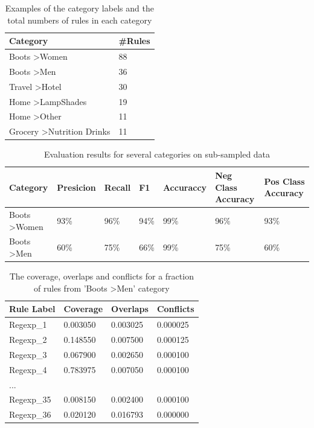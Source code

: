 \begin{table}
  \caption{Examples of the category labels and the total numbers of rules in each category}
  \label{tab:numrules}
  \begin{tabular}{ll}
    \toprule
    Category & \#Rules\\
    \midrule
    Boots \textgreater Women &	88	\\
    Boots \textgreater Men	& 36 \\
 	Travel \textgreater Hotel & 30 \\
 	Home \textgreater LampShades & 19 \\
 	Home \textgreater Other & 11 \\
 	Grocery \textgreater Nutrition Drinks & 11 \\
    \bottomrule
  \end{tabular}
\end{table}

\begin{table}
  \caption{Evaluation results for several categories on sub-sampled data}
  \label{tab:evaluation}
  \begin{tabular}{lllllll}
    \toprule
    Category & Presicion & Recall & F1 & Accuraccy & Neg Class Accuracy & Pos Class Accuracy\\
    \midrule 
    Boots \textgreater Women	& 93\% & 96\% & 94\% & 99\% & 96\% & 93\% \\
    Boots \textgreater Men &	60\%	& 75\% & 66\% & 99\% & 75\% & 60\% \\
    \bottomrule
  \end{tabular}
\end{table}

\begin{table}
  \caption{The coverage, overlaps and conflicts for a fraction of rules from 'Boots \textgreater Men' category}
  \label{tab:overlapconflict}
  \begin{tabular}{llll}
    \toprule
    Rule Label & Coverage & Overlaps & Conflicts \\
    \midrule
    Regexp_1	& 0.003050 & 0.003025 & 0.000025 \\
    Regexp_2	& 0.148550 & 0.007500 & 0.000125 \\
    Regexp_3	& 0.067900 & 0.002650 & 0.000100 \\
    Regexp_4	& 0.783975 & 0.007050 & 0.000100 \\
    ... \\
    Regexp_{35}	& 0.008150 & 0.002400 & 0.000100 \\
    Regexp_{36}	& 0.020120 & 0.016793 & 0.000000 \\
    \bottomrule
  \end{tabular}
\end{table}

